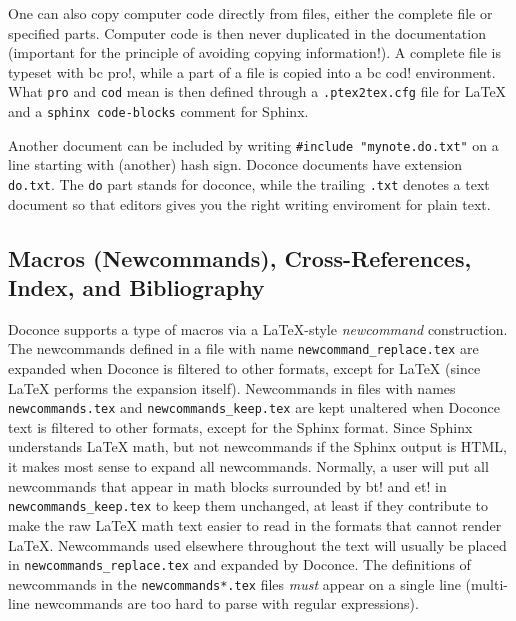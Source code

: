 \documentclass{article}
\begin{document}

One can also copy computer code directly from files, either the
complete file or specified parts.  Computer code is then never
duplicated in the documentation (important for the principle of
avoiding copying information!). A complete file is typeset 
with {\fontsize{10pt}{10pt}\verb!!bc pro!}, while a part of a file is copied into a {\fontsize{10pt}{10pt}\verb!!bc cod!}
environment. What {\fontsize{10pt}{10pt}\verb!pro!} and {\fontsize{10pt}{10pt}\verb!cod!} mean is then defined through
a {\fontsize{10pt}{10pt}\verb!.ptex2tex.cfg!} file for {\LaTeX} and a {\fontsize{10pt}{10pt}\verb!sphinx code-blocks!}
comment for Sphinx.

Another document can be included by writing {\fontsize{10pt}{10pt}\verb!#include "mynote.do.txt"!}
on a line starting with (another) hash sign.  Doconce documents have
extension {\fontsize{10pt}{10pt}\verb!do.txt!}. The {\fontsize{10pt}{10pt}\verb!do!} part stands for doconce, while the
trailing {\fontsize{10pt}{10pt}\verb!.txt!} denotes a text document so that editors gives you the
right writing enviroment for plain text.

\subsection{Macros (Newcommands), Cross-References, Index, and Bibliography}

\label{newcommands}

Doconce supports a type of macros via a {\LaTeX}-style \emph{newcommand}
construction.  The newcommands defined in a file with name
{\fontsize{10pt}{10pt}\verb!newcommand_replace.tex!} are expanded when Doconce is filtered to
other formats, except for {\LaTeX} (since {\LaTeX} performs the expansion
itself).  Newcommands in files with names {\fontsize{10pt}{10pt}\verb!newcommands.tex!} and
{\fontsize{10pt}{10pt}\verb!newcommands_keep.tex!} are kept unaltered when Doconce text is
filtered to other formats, except for the Sphinx format. Since Sphinx
understands {\LaTeX} math, but not newcommands if the Sphinx output is
HTML, it makes most sense to expand all newcommands.  Normally, a user
will put all newcommands that appear in math blocks surrounded by
{\fontsize{10pt}{10pt}\verb!!bt!} and {\fontsize{10pt}{10pt}\verb!!et!} in {\fontsize{10pt}{10pt}\verb!newcommands_keep.tex!} to keep them unchanged, at
least if they contribute to make the raw {\LaTeX} math text easier to
read in the formats that cannot render {\LaTeX}.  Newcommands used
elsewhere throughout the text will usually be placed in
{\fontsize{10pt}{10pt}\verb!newcommands_replace.tex!} and expanded by Doconce.  The definitions of
newcommands in the {\fontsize{10pt}{10pt}\verb!newcommands*.tex!} files \emph{must} appear on a single
line (multi-line newcommands are too hard to parse with regular
expressions).
\end{document}

